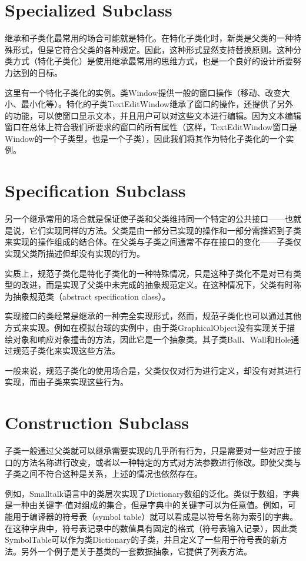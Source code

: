 \section{Specialized Subclass}

继承和子类化最常用的场合可能就是特化。在特化子类化时，新类是父类的一种特殊形式，但是它符合父类的各种规定。因此，这种形式显然支持替换原则。这种分类方式（特化子类化）是使用继承最常用的思维方式，也是一个良好的设计所要努力达到的目标。

这里有一个特化子类化的实例。类Window提供一般的窗口操作（移动、改变大小、最小化等）。特化的子类TextEditWindow继承了窗口的操作，还提供了另外的功能，可以使窗口显示文本，并且用户可以对这些文本进行编辑。因为文本编辑窗口在总体上符合我们所要求的窗口的所有属性（这样，TextEditWindow窗口是Window的一个子类型，也是一个子类），因此我们将其作为特化子类化的一个实例。



\section{Specification Subclass}

另一个继承常用的场合就是保证使子类和父类维持同一个特定的公共接口——也就是说，它们实现同样的方法。父类是由一部分已实现的操作和一部分需推迟到子类来实现的操作组成的结合体。在父类与子类之间通常不存在接口的变化——子类仅实现父类所描述但却没有实现的行为。

实质上，规范子类化是特化子类化的一种特殊情况，只是这种子类化不是对已有类型的改进，而是实现了父类中未完成的抽象规范定义。在这种情况下，父类有时称为抽象规范类（abstract specification class）。

实现接口的类经常是继承的一种完全实现形式，然而，规范子类化也可以通过其他方式来实现。例如在模拟台球的实例中，由于类GraphicalObject没有实现关于描绘对象和响应对象撞击的方法，因此它是一个抽象类。其子类Ball、Wall和Hole通过规范子类化来实现这些方法。

一般来说，规范子类化的使用场合是，父类仅仅对行为进行定义，却没有对其进行实现，而由子类来实现这些行为。

\section{Construction Subclass}

子类一般通过父类就可以继承需要实现的几乎所有行为，只是需要对一些对应于接口的方法名称进行改变，或者以一种特定的方式对方法参数进行修改。即使父类与子类之间不符合这种是关系，上述的情况也依然存在。

例如，Smalltalk语言中的类层次实现了Dictionary数组的泛化。类似于数组，字典是一种由关键字-值对组成的集合，但是字典中的关键字可以为任意值。例如，可能用于编译器的符号表（symbol table）就可以看成是以符号名称为索引的字典。在这种字典中，符号表记录中的数值具有固定的格式（符号表输入记录），因此类SymbolTable可以作为类Dictionary的子类，并且定义了一些用于符号表的新方法。另外一个例子是关于基类的一套数据抽象，它提供了列表方法。

